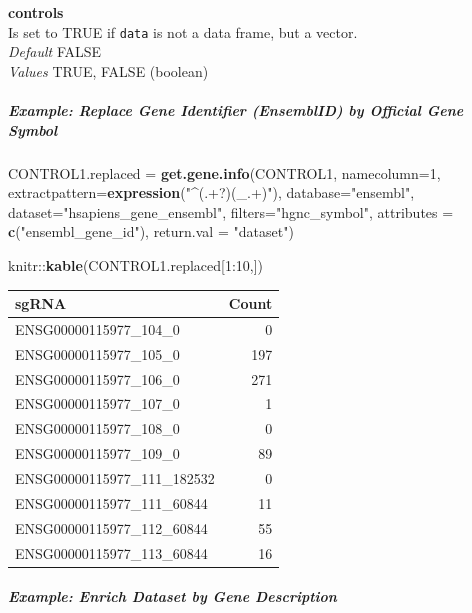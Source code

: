 \documentclass[]{article}
\newenvironment{Shaded}{\begin{snugshade}}{\end{snugshade}}
\newcommand{\KeywordTok}[1]{\textcolor[rgb]{0.13,0.29,0.53}{\textbf{{#1}}}}
\newcommand{\DataTypeTok}[1]{\textcolor[rgb]{0.13,0.29,0.53}{{#1}}}
\newcommand{\DecValTok}[1]{\textcolor[rgb]{0.00,0.00,0.81}{{#1}}}
\newcommand{\StringTok}[1]{\textcolor[rgb]{0.31,0.60,0.02}{{#1}}}
\newcommand{\NormalTok}[1]{{#1}}
\let\oldsubparagraph\subparagraph
\renewcommand{\subparagraph}[1]{\oldsubparagraph{#1}\mbox{}}
\begin{document}
\textbf{controls}\\
Is set to TRUE if \texttt{data} is not a data frame, but a vector.\\
\emph{Default} FALSE\\
\emph{Values} TRUE, FALSE (boolean)

\subparagraph{Example: Replace Gene Identifier (EnsemblID) by Official
Gene
Symbol}\label{example-replace-gene-identifier-ensemblid-by-official-gene-symbol}

\begin{Shaded}
\begin{Highlighting}[]
\NormalTok{CONTROL1.replaced =}\StringTok{ }\KeywordTok{get.gene.info}\NormalTok{(CONTROL1, }\DataTypeTok{namecolumn=}\DecValTok{1}\NormalTok{,}
      \DataTypeTok{extractpattern=}\KeywordTok{expression}\NormalTok{(}\StringTok{"^(.+?)(_.+)"}\NormalTok{), }\DataTypeTok{database=}\StringTok{"ensembl"}\NormalTok{, }\DataTypeTok{dataset=}\StringTok{"hsapiens_gene_ensembl"}\NormalTok{,}
      \DataTypeTok{filters=}\StringTok{"hgnc_symbol"}\NormalTok{, }\DataTypeTok{attributes =} \KeywordTok{c}\NormalTok{(}\StringTok{"ensembl_gene_id"}\NormalTok{), }\DataTypeTok{return.val =} \StringTok{"dataset"}\NormalTok{)}

\NormalTok{knitr::}\KeywordTok{kable}\NormalTok{(CONTROL1.replaced[}\DecValTok{1}\NormalTok{:}\DecValTok{10}\NormalTok{,])}
\end{Highlighting}
\end{Shaded}

\begin{longtable}[c]{@{}lr@{}}
\toprule
sgRNA & Count\tabularnewline
\midrule
\endhead
ENSG00000115977\_104\_0 & 0\tabularnewline
ENSG00000115977\_105\_0 & 197\tabularnewline
ENSG00000115977\_106\_0 & 271\tabularnewline
ENSG00000115977\_107\_0 & 1\tabularnewline
ENSG00000115977\_108\_0 & 0\tabularnewline
ENSG00000115977\_109\_0 & 89\tabularnewline
ENSG00000115977\_111\_182532 & 0\tabularnewline
ENSG00000115977\_111\_60844 & 11\tabularnewline
ENSG00000115977\_112\_60844 & 55\tabularnewline
ENSG00000115977\_113\_60844 & 16\tabularnewline
\bottomrule
\end{longtable}

\subparagraph{Example: Enrich Dataset by Gene
Description}\label{example-enrich-dataset-by-gene-description}
\end{document}
